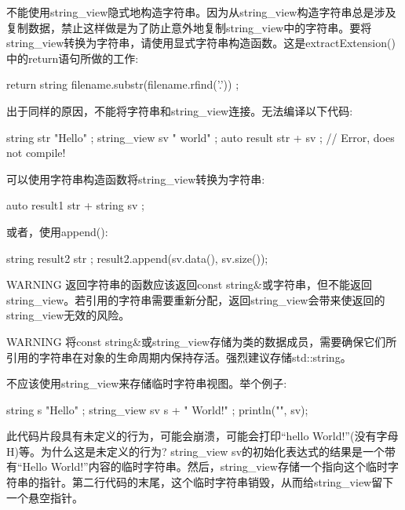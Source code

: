 不能使用string\_view隐式地构造字符串。因为从string\_view构造字符串总是涉及复制数据，禁止这样做是为了防止意外地复制string\_view中的字符串。要将string\_view转换为字符串，请使用显式字符串构造函数。这是extractExtension()中的return语句所做的工作:

\begin{cpp}
return string { filename.substr(filename.rfind('.')) };
\end{cpp}

出于同样的原因，不能将字符串和string\_view连接。无法编译以下代码:

\begin{cpp}
string str { "Hello" };
string_view sv { " world" };
auto result { str + sv }; // Error, does not compile!
\end{cpp}

可以使用字符串构造函数将string\_view转换为字符串:

\begin{cpp}
auto result1 { str + string { sv } };
\end{cpp}

或者，使用append():

\begin{cpp}
string result2 { str };
result2.append(sv.data(), sv.size());
\end{cpp}

\begin{myWarning}{WARNING}
返回字符串的函数应该返回const string\&或字符串，但不能返回string\_view。若引用的字符串需要重新分配，返回string\_view会带来使返回的string\_view无效的风险。
\end{myWarning}

\begin{myWarning}{WARNING}
将const string\&或string\_view存储为类的数据成员，需要确保它们所引用的字符串在对象的生命周期内保持存活。强烈建议存储std::string。
\end{myWarning}


不应该使用string\_view来存储临时字符串视图。举个例子:

\begin{cpp}
string s { "Hello" };
string_view sv { s + " World!" };
println("{}", sv);
\end{cpp}

此代码片段具有未定义的行为，可能会崩溃，可能会打印“hello World!”(没有字母H)等。为什么这是未定义的行为? string\_view sv的初始化表达式的结果是一个带有“Hello World!”内容的临时字符串。然后，string\_view存储一个指向这个临时字符串的指针。第二行代码的末尾，这个临时字符串销毁，从而给string\_view留下一个悬空指针。

